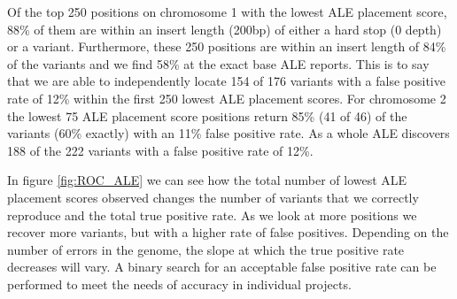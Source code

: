 \documentclass[phd,tocprelim]{cornell}
\begin{document}
Of the top 250 positions on chromosome 1 with the lowest ALE placement score, 88\% of
them are within an insert length (200bp) of either a hard stop (0 depth) or a variant. Furthermore,
these 250 positions are within an insert length of 84\% of the variants and we find 58\% at the
exact base ALE reports. This is to say that we are able to independently locate 154 of 176
variants with a false positive rate of 12\% within the first 250 lowest ALE placement scores. For
chromosome 2 the lowest 75 ALE placement score positions return 85\% (41 of 46) of the variants
(60\% exactly) with an 11\% false positive rate. As a whole ALE discovers 188 of the 222 variants
with a false positive rate of 12\%.

In figure \ref{fig:ROC_ALE} we can see how the total number of lowest ALE placement scores observed
changes the number of variants that we correctly reproduce and the total true positive rate. As
we look at more positions we recover more variants, but with a higher rate of false positives.
Depending on the number of errors in the genome, the slope at which the true positive rate
decreases will vary. A binary search for an acceptable false positive rate can be performed to
meet the needs of accuracy in individual projects.
\end{document}
